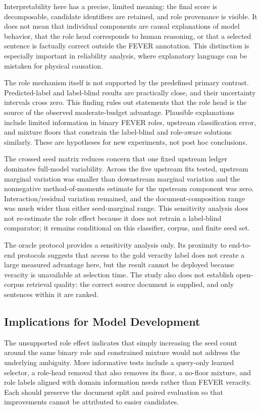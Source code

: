 \documentclass[applsci,article,submit,moreauthors]{Definitions/mdpi}
\begin{document}
Interpretability here has a precise, limited meaning: the final score is decomposable, candidate identifiers are retained, and role provenance is visible. It does not mean that individual components are causal explanations of model behavior, that the role head corresponds to human reasoning, or that a selected sentence is factually correct outside the FEVER annotation. This distinction is especially important in reliability analysis, where explanatory language can be mistaken for physical causation.

The role mechanism itself is not supported by the predefined primary contrast. Predicted-label and label-blind results are practically close, and their uncertainty intervals cross zero. This finding rules out statements that the role head is the source of the observed moderate-budget advantage. Plausible explanations include limited information in binary FEVER roles, upstream classification error, and mixture floors that constrain the label-blind and role-aware solutions similarly. These are hypotheses for new experiments, not post hoc conclusions.

The crossed seed matrix reduces concern that one fixed upstream ledger dominates full-model variability. Across the five upstream fits tested, upstream marginal variation was smaller than downstream marginal variation and the nonnegative method-of-moments estimate for the upstream component was zero. Interaction/residual variation remained, and the document-composition range was much wider than either seed-marginal range. This sensitivity analysis does not re-estimate the role effect because it does not retrain a label-blind comparator; it remains conditional on this classifier, corpus, and finite seed set.

The oracle protocol provides a sensitivity analysis only. Its proximity to end-to-end protocols suggests that access to the gold veracity label does not create a large measured advantage here, but the result cannot be deployed because veracity is unavailable at selection time. The study also does not establish open-corpus retrieval quality: the correct source document is supplied, and only sentences within it are ranked.

\subsection{Implications for Model Development}
The unsupported role effect indicates that simply increasing the seed count around the same binary role and constrained mixture would not address the underlying ambiguity. More informative tests include a query-only learned selector, a role-head removal that also removes its floor, a no-floor mixture, and role labels aligned with domain information needs rather than FEVER veracity. Each should preserve the document split and paired evaluation so that improvements cannot be attributed to easier candidates.
\end{document}
